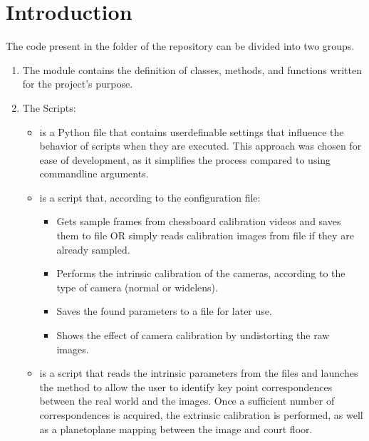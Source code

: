 \documentclass[letterpaper,10pt,english]{sphinxmanual}
\begin{document}
\chapter{Introduction}
\label{\detokenize{introduction:introduction}}\label{\detokenize{introduction:intro}}\label{\detokenize{introduction::doc}}
\sphinxAtStartPar
The code present in the  folder of the repository can be divided into two groups.
\begin{enumerate}
%
\item {} 
\sphinxAtStartPar
The  module contains the definition of classes, methods, and functions written for the project’s purpose.

\item {} 
\sphinxAtStartPar
The Scripts:
\begin{itemize}
\item {} 
\sphinxAtStartPar
{} is a Python file that contains user\sphinxhyphen{}definable settings that influence the behavior of scripts when they are executed. This approach was chosen for ease of development, as it simplifies the process compared to using command\sphinxhyphen{}line arguments.

\item {} 
\sphinxAtStartPar
{} is a script that, according to the configuration file:
\begin{itemize}
\item {} 
\sphinxAtStartPar
Gets sample frames from chessboard calibration videos and saves them to file OR simply reads calibration images from file if they are already sampled.

\item {} 
\sphinxAtStartPar
Performs the intrinsic calibration of the cameras, according to the type of camera (normal or wide\sphinxhyphen{}lens).

\item {} 
\sphinxAtStartPar
Saves the found parameters to a  file for later use.

\item {} 
\sphinxAtStartPar
Shows the effect of camera calibration by undistorting the raw images.

\end{itemize}

\item {} 
\sphinxAtStartPar
{} is a script that reads the intrinsic parameters from the  files and launches the  method to allow the user to identify key point correspondences between the real world and the images. Once a sufficient number of correspondences is acquired, the extrinsic calibration is performed, as well as a plane\sphinxhyphen{}to\sphinxhyphen{}plane mapping between the image and court floor.


\end{itemize}
\end{enumerate}
\end{document}
